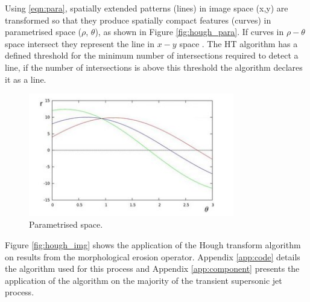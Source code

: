 Using \ref{eqn:para}, spatially extended patterns (lines) in image space (x,y) are transformed so that they produce spatially compact features (curves) in parametrised space ($\rho$, $\theta$), as shown in Figure \ref{fig:hough_para}. If curves in $\rho - \theta$ space intersect they represent the line in $x-y$ space . The HT algorithm has a defined threshold for the minimum number of intersections required to detect a line, if the number of intersections is above this threshold the algorithm declares it as a line. 

\begin{figure}[H] 
	\centering
	\includegraphics[width=0.8\textwidth]{hough_para.png} 
	\caption{Parametrised space.}
	\label{fig:hough}
\end{figure}

Figure \ref{fig:hough_img} shows the application of the Hough transform algorithm on results from the morphological erosion operator. Appendix \ref{app:code} details the algorithm used for this process and Appendix \ref{app:component} presents the application of the algorithm on the majority of the transient supersonic jet process.

